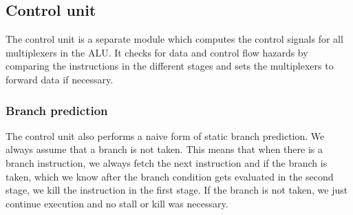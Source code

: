 \documentclass[12pt]{article}
\begin{document}
\subsection*{Control unit}
\label{sub:control-unit}
The control unit is a separate module which computes the control signals for all multiplexers in the ALU. It checks for data and control flow hazards by comparing the instructions in the different stages and sets the multiplexers to forward data if necessary.

\subsubsection*{Branch prediction}
The control unit also performs a naive form of static branch prediction. We always assume that a branch is not taken. This means that when there is a branch instruction, we always fetch the next instruction and if the branch is taken, which we know after the branch condition gets evaluated in the second stage, we kill the instruction in the first stage. If the branch is not taken, we just continue execution and no stall or kill was necessary.
\end{document}
